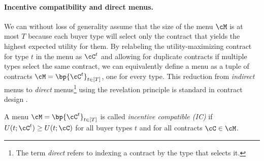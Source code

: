 

    


\paragraph{Incentive compatibility and direct menus.} \label{IC}

We can without loss of generality assume that the size of the menu $\cM$ is at most $T$ because each buyer type will select only the contract that yields the highest expected utility for them. By relabeling the utility-maximizing contract for type $t$ in the menu as $\cC^t$ and allowing for duplicate contracts if multiple types select the same contract, we can equivalently define a menu as a tuple of contracts $\cM = \bp{\cC^t}_{t\in [T]}$, one for every type. This reduction from \emph{indirect} menus to \emph{direct} menus\footnote{The term \emph{direct} refers to indexing a contract by the type that selects it.} using the revelation principle is standard in contract design \citep{castiglioni2021bayesian}. 


\begin{definition*}
A menu $\cM = \bp{\cC^t}_{t\in [T]}$  is called \emph{incentive compatible (IC)} if $U(t; \cC^t)  \geq U(t;\cC)$ for all buyer types $t$ and for all contracts $\cC\in \cM$.
\end{definition*}


